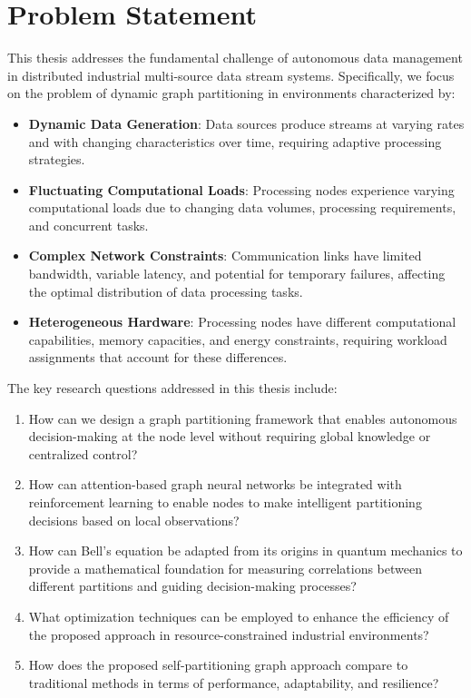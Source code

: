\documentclass{article}
\begin{document}
\section{Problem Statement}

This thesis addresses the fundamental challenge of autonomous data management in distributed industrial multi-source data stream systems. Specifically, we focus on the problem of dynamic graph partitioning in environments characterized by:

\begin{itemize}
    \item \textbf{Dynamic Data Generation}: Data sources produce streams at varying rates and with changing characteristics over time, requiring adaptive processing strategies.
    
    \item \textbf{Fluctuating Computational Loads}: Processing nodes experience varying computational loads due to changing data volumes, processing requirements, and concurrent tasks.
    
    \item \textbf{Complex Network Constraints}: Communication links have limited bandwidth, variable latency, and potential for temporary failures, affecting the optimal distribution of data processing tasks.
    
    \item \textbf{Heterogeneous Hardware}: Processing nodes have different computational capabilities, memory capacities, and energy constraints, requiring workload assignments that account for these differences.
\end{itemize}

The key research questions addressed in this thesis include:

\begin{enumerate}
    \item How can we design a graph partitioning framework that enables autonomous decision-making at the node level without requiring global knowledge or centralized control?
    
    \item How can attention-based graph neural networks be integrated with reinforcement learning to enable nodes to make intelligent partitioning decisions based on local observations?
    
    \item How can Bell's equation be adapted from its origins in quantum mechanics to provide a mathematical foundation for measuring correlations between different partitions and guiding decision-making processes?
    
    \item What optimization techniques can be employed to enhance the efficiency of the proposed approach in resource-constrained industrial environments?
    
    \item How does the proposed self-partitioning graph approach compare to traditional methods in terms of performance, adaptability, and resilience?
\end{enumerate}
\end{document}

